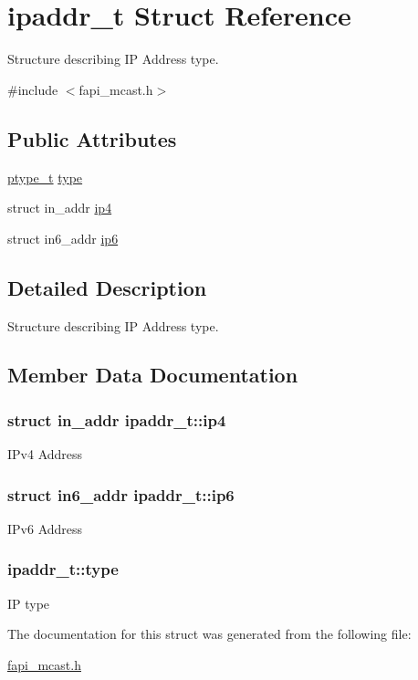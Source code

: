 \hypertarget{structipaddr__t}{\section{ipaddr\-\_\-t Struct Reference}
\label{structipaddr__t}
}


Structure describing I\-P Address type.  




{\ttfamily \#include $<$fapi\-\_\-mcast.\-h$>$}

\subsection*{Public Attributes}
\begin{DoxyCompactItemize}
\item 
\hyperlink{group__FAPI__MCAST_ga723256dea8a6fd9c487829bc1ed6f911}{ptype\-\_\-t} \hyperlink{structipaddr__t_a6eee12f8c9cc3b1968e5d4e19e245d02}{type}
\item 
struct in\-\_\-addr \hyperlink{structipaddr__t_a34c3670f4c9aebd0dc23618d2aa33e75}{ip4}
\item 
struct in6\-\_\-addr \hyperlink{structipaddr__t_a5dec2ea8a3e428df65eff5cc00ab527c}{ip6}
\end{DoxyCompactItemize}


\subsection{Detailed Description}
Structure describing I\-P Address type. 

\subsection{Member Data Documentation}
\hypertarget{structipaddr__t_a34c3670f4c9aebd0dc23618d2aa33e75}{
\subsubsection[{ip4}]{\setlength{\rightskip}{0pt plus 5cm}struct in\-\_\-addr ipaddr\-\_\-t\-::ip4}}\label{structipaddr__t_a34c3670f4c9aebd0dc23618d2aa33e75}
I\-Pv4 Address \hypertarget{structipaddr__t_a5dec2ea8a3e428df65eff5cc00ab527c}{
\subsubsection[{ip6}]{\setlength{\rightskip}{0pt plus 5cm}struct in6\-\_\-addr ipaddr\-\_\-t\-::ip6}}\label{structipaddr__t_a5dec2ea8a3e428df65eff5cc00ab527c}
I\-Pv6 Address \hypertarget{structipaddr__t_a6eee12f8c9cc3b1968e5d4e19e245d02}{
\subsubsection[{type}]{ ipaddr\-\_\-t\-::type}}\label{structipaddr__t_a6eee12f8c9cc3b1968e5d4e19e245d02}
I\-P type 

The documentation for this struct was generated from the following file\-:\begin{DoxyCompactItemize}
\item 
\hyperlink{fapi__mcast_8h}{fapi\-\_\-mcast.\-h}\end{DoxyCompactItemize}
